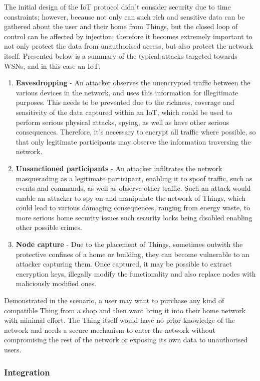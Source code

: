 \documentclass{mprop}
\begin{document}
The initial design of the IoT protocol didn't consider security due to time constraints; however, because not only can such rich and sensitive data can be gathered about the user and their home from Things, but the closed loop of control can be affected by injection; therefore it becomes extremely important to not only protect the data from unauthorised access, but also protect the network itself. 
Presented below is a summary of the typical attacks targeted towards WSNs, and in this case an IoT.
\begin{enumerate}
  \item \textbf{Eavesdropping} - An attacker observes the unencrypted traffic between the various devices in the network, and uses this information for illegitimate purposes. This needs to be prevented due to the richness, coverage and sensitivity of the data captured within an IoT, which could be used to perform serious physical attacks, spying, as well as have other serious consequences. Therefore, it's necessary to encrypt all traffic where possible, so that only legitimate participants may observe the information traversing the network.
  \item \textbf{Unsanctioned participants} - An attacker infiltrates the network masquerading as a legitimate participant, enabling it to spoof traffic, such as events and commands, as well as observe other traffic. Such an attack would enable an attacker to spy on and manipulate the network of Things, which could lead to various damaging consequences, ranging from energy waste, to more serious home security issues such security locks being disabled enabling other possible crimes.
  \item \textbf{Node capture} - Due to the placement of Things, sometimes outwith the protective confines of a home or building, they can become vulnerable to an attacker capturing them. Once captured, it may be possible to extract encryption keys, illegally modify the functionality and also replace nodes with maliciously modified ones.
\end{enumerate}

Demonstrated in the scenario, a user may want to purchase any kind of compatible Thing from a shop and then want bring it into their home network with minimal effort. The Thing itself would have no prior knowledge of the network and needs a secure mechanism to enter the network without compromising the rest of the network or exposing its own data to unauthorised users. 

\subsubsection{Integration} %
\label{ssub:integration}
\end{document}
